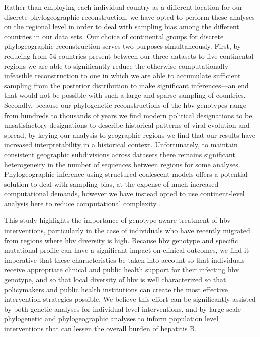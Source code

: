 Rather than employing each individual country as a different location for our discrete phylogeographic reconstruction, we have opted to perform these analyses on the regional level in order to deal with sampling bias among the different countries in our data sets.
Our choice of continental groups for discrete phylogeographic reconstruction serves two purposes simultaneously.
First, by reducing from 54 countries present between our three datasets to five continental regions we are able to significantly reduce the otherwise computationally infeasible reconstruction to one in which we are able to accumulate sufficient sampling from the posterior distribution to make significant inferences---an end that would not be possible with such a large and sparse sampling of countries.
Secondly, because our phylogenetic reconstructions of the \gls{hbv} genotypes range from hundreds to thousands of years we find modern political designations to be unsatisfactory designations to describe historical patterns of viral evolution and spread, by keying our analysis to geographic regions we find that our results have increased interpretability in a historical context.
Unfortunately, to maintain consistent geographic subdivisions across datasets there remains significant heterogeneity in the number of sequences between regions for some analyses.
Phylogeographic inference using structured coalescent models \citep{maio2015new,muller2018mascot} offers a potential solution to deal with sampling bias, at the expense of much increased computational demands, however we have instead opted to use continent-level analysis here to reduce computational complexity \citep{hong2020search}.

This study highlights the importance of genotype-aware treatment of \gls{hbv} interventions, particularly in the case of individuals who have recently migrated from regions where \gls{hbv} diversity is high.
Because \gls{hbv} genotype and specific mutational profile can have a significant impact on clinical outcomes, we find it imperative that these characteristics be taken into account so that individuals receive appropriate clinical and public health support for their infecting \gls{hbv} genotype, and so that local diversity of \gls{hbv} is well characterized so that policymakers and public health institutions can create the most effective intervention strategies possible.
We believe this effort can be significantly assisted by both genetic analyses for individual level interventions, and by large-scale phylogenetic and phylogeographic analyses to inform population level interventions that can lessen the overall burden of hepatitis B.


